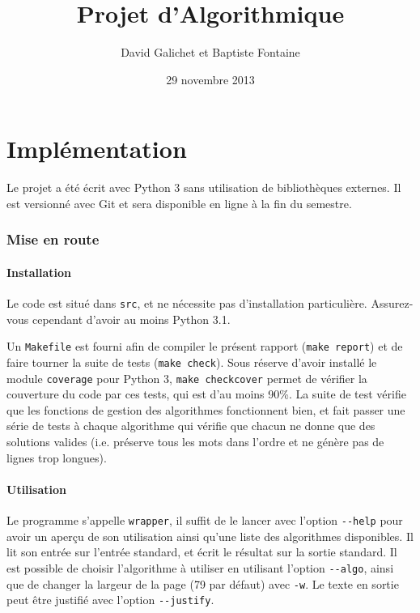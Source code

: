 \documentclass[a4paper, 11pt]{article}
\begin{document}
\title{Projet d'Algorithmique}
\author{David Galichet et Baptiste Fontaine}
\date{29 novembre 2013}
\maketitle
\newpage
\tableofcontents
\newpage


\part{Implémentation}

Le projet a été écrit avec Python 3 sans utilisation de bibliothèques externes.
Il est versionné avec Git et sera disponible en ligne à la fin du semestre.

\section{Mise en route}
\subsection{Installation}

Le code est situé dans \verb|src|, et ne nécessite pas d'installation
particulière. Assurez-vous cependant d'avoir au moins Python 3.1.

Un \verb|Makefile| est fourni afin de compiler le présent rapport
(\verb|make report|) et de faire tourner la suite de tests (\verb|make check|).
Sous réserve d'avoir installé le module \verb|coverage| pour Python 3,
\verb|make checkcover| permet de vérifier la couverture du code par ces tests,
qui est d'au moins 90\%.  La suite de test vérifie que les fonctions de gestion
des algorithmes fonctionnent bien, et fait passer une série de tests à chaque
algorithme qui vérifie que chacun ne donne que des solutions valides (i.e.
préserve tous les mots dans l'ordre et ne génère pas de lignes trop longues).

\subsection{Utilisation}

Le programme s'appelle \verb|wrapper|, il suffit de le lancer avec l'option
\verb|--help| pour avoir un aperçu de son utilisation ainsi qu'une liste des
algorithmes disponibles. Il lit son entrée sur l'entrée standard, et écrit le
résultat sur la sortie standard. Il est possible de choisir l'algorithme à
utiliser en utilisant l'option \verb|--algo|, ainsi que de changer la largeur
de la page (79 par défaut) avec \verb|-w|. Le texte en sortie peut être
justifié avec l'option \verb|--justify|.
\end{document}
